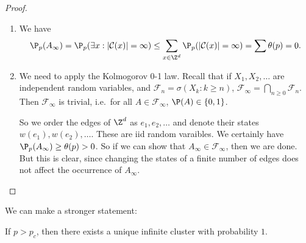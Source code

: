 \documentclass[a4paper]{article}
\begin{document}
\begin{proof}\leavevmode
  \begin{enumerate}
    \item We have
      \[
        \P_p(A_\infty) = \P_p(\exists x: |\mathcal{C}(x)| = \infty) \leq \sum_{x \in \Z^d} \P_p(|\mathcal{C}(x)| = \infty) = \sum \theta(p) = 0.
      \]
    \item We need to apply the Kolmogorov 0-1 law. Recall that if $X_1, X_2, \ldots$ are independent random variables, and $\mathcal{F}_n = \sigma(X_k: k \geq n)$, $\mathcal{F}_\infty = \bigcap_{n \geq 0} \mathcal{F}_n$. Then $\mathcal{F}_\infty$ is trivial, i.e.\ for all $A \in \mathcal{F}_\infty$, $\P(A) \in \{0, 1\}$.

      So we order the edges of $\Z^d$ as $e_1, e_2, \ldots$ and denote their states $w(e_1), w(e_2), \ldots$. These are iid random varaibles. We certainly have $\P_p(A_\infty) \geq \theta(p) > 0$. So if we can show that $A_\infty \in \mathcal{F}_\infty$, then we are done. But this is clear, since changing the states of a finite number of edges does not affect the occurrence of $A_\infty$.
  \end{enumerate}
\end{proof}

We can make a stronger statement:
\begin{thm} %
  If $p > p_c$, then there exists a unique infinite cluster with probability $1$.
\end{thm}
\end{document}
